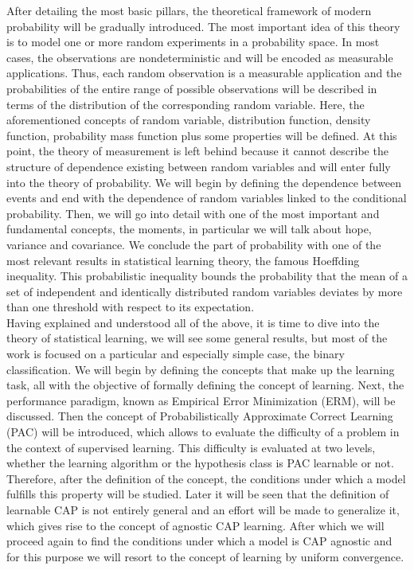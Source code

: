     After detailing the most basic pillars, the theoretical framework of modern probability will be gradually introduced. The most important idea of this theory is to model one or more random experiments in a probability space. In most cases, the observations are nondeterministic and will be encoded as measurable applications. Thus, each random observation is a measurable application and the probabilities of the entire range of possible observations will be described in terms of the distribution of the corresponding random variable. Here, the aforementioned concepts of random variable, distribution function, density function, probability mass function plus some properties will be defined. At this point, the theory of measurement is left behind because it cannot describe the structure of dependence existing between random variables and will enter fully into the theory of probability. We will begin by defining the dependence between events and end with the dependence of random variables linked to the conditional probability. Then, we will go into detail with one of the most important and fundamental concepts, the moments, in particular we will talk about hope, variance and covariance. We conclude the part of probability with one of the most relevant results in statistical learning theory, the famous Hoeffding inequality. This probabilistic inequality bounds the probability that the mean of a set of independent and identically distributed random variables deviates by more than one threshold with respect to its expectation. \\



    Having explained and understood all of the above, it is time to dive into the theory of statistical learning, we will see some general results, but most of the work is focused on a particular and especially simple case, the binary classification. We will begin by defining the concepts that make up the learning task, all with the objective of formally defining the concept of learning. Next, the performance paradigm, known as Empirical Error Minimization (ERM), will be discussed. Then the concept of Probabilistically Approximate Correct Learning (PAC) will be introduced, which allows to evaluate the difficulty of a problem in the context of supervised learning. This difficulty is evaluated at two levels, whether the learning algorithm or the hypothesis class is PAC learnable or not. Therefore, after the definition of the concept, the conditions under which a model fulfills this property will be studied. Later it will be seen that the definition of learnable CAP is not entirely general and an effort will be made to generalize it, which gives rise to the concept of agnostic CAP learning. After which we will proceed again to find the conditions under which a model is CAP agnostic and for this purpose we will resort to the concept of learning by uniform convergence. \\
    
